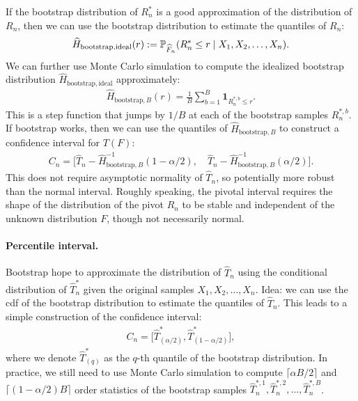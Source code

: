 \documentclass[11pt,letterpaper]{article}
\numberwithin{assumption}{lecture}
\numberwithin{theorem}{lecture}
\numberwithin{proposition}{lecture}
\numberwithin{lemma}{lecture}
\numberwithin{claim}{lecture}
\numberwithin{corollary}{lecture}
\numberwithin{definition}{lecture}
\numberwithin{conjecture}{lecture}
\numberwithin{remark}{lecture}
\numberwithin{example}{lecture}
\numberwithin{equation}{lecture}
\begin{document}
If the bootstrap distribution of $R_n^*$ is a good approximation of the distribution of $R_n$, then we can use the bootstrap distribution to estimate the quantiles of $R_n$:
\begin{align*}
  \widehat{H}_{\mathrm{bootstrap, ideal}} (r) := {\mathbb{P}}_{\widehat{F}_n} (R_n^* \leq r \mid X_1, X_2, \ldots, X_n).
\end{align*}
We can further use Monte Carlo simulation to compute the idealized bootstrap distribution $\widehat{H}_{\mathrm{bootstrap, ideal}}$ approximately:
\begin{align*}
  \widehat{H}_{\mathrm{bootstrap}, B} (r) = \frac{1}{B} \sum_{b=1}^B \bm{1}_{R_n^{*, b} \leq r}.
\end{align*}
This is a step function that jumps by $1/B$ at each of the bootstrap samples $R_n^{*, b}$. If bootstrap works, then we can use the quantiles of $\widehat{H}_{\mathrm{bootstrap}, B}$ to construct a confidence interval for $T(F)$:
\begin{align*}
  C_n = \Big[\widehat{T}_n - \widehat{H}_{\mathrm{bootstrap}, B}^{-1} (1 - \alpha/2), \quad \widehat{T}_n - \widehat{H}_{\mathrm{bootstrap}, B}^{-1} (\alpha/2)\Big].
\end{align*}
This does not require asymptotic normality of $\widehat{T}_n$, so potentially more robust than the normal interval. Roughly speaking, the pivotal interval requires the shape of the distribution of the pivot $R_n$ to be stable and independent of the unknown distribution $F$, though not necessarily normal.


\paragraph{Percentile interval.} Bootstrap hope to approximate the distribution of $\widehat{T}_n$ using the conditional distribution of $\widehat{T}_n^*$ given the original samples $X_1, X_2, \ldots, X_n$. Idea: we can use the cdf of the bootstrap distribution to estimate the quantiles of $\widehat{T}_n$. This leads to a simple construction of the confidence interval:
\begin{align*}
  C_n = \Big[ \widehat{T}^*_{(\alpha / 2)},  \widehat{T}^*_{(1 - \alpha / 2)} \Big],
\end{align*}
where we denote $\widehat{T}^*_{(q)}$ as the $q$-th quantile of the bootstrap distribution. In practice, we still need to use Monte Carlo simulation to compute $\lceil\alpha B / 2\rceil$ and $\lceil (1 - \alpha / 2) B \rceil$ order statistics of the bootstrap samples $\widehat{T}_n^{*, 1}, \widehat{T}_n^{*, 2}, \ldots, \widehat{T}_n^{*, B}$.
\end{document}
